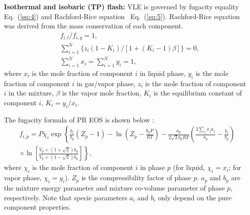 \textbf{Isothermal and isobaric (TP) flash:}
VLE is governed by fugacity equality Eq.~(\ref{eq:4}) and Rachford-Rice equation~\cite{rachford1952procedure} Eq.~(\ref{eq:5}). Rachford-Rice equation was derived from the mass conservation of each component.
\begin{align}
&f_{i, l}\big/f_{i, g}=1,  \label{eq:4} \\
&\sum_{i=1}^{N}\bigg\{z_i\left(1-K_i\right)\bigg/\left[1+\left(K_i-1\right)\beta\right]\bigg\}=0, \label{eq:5} \\
&\sum_{i=1}^{N}x_i=\sum_{i=1}^{N}y_i=1,  \label{eq:5-2}
\end{align}
where $x_i$ is the mole fraction of component $i$ in liquid phase, $y_i$ is the mole fraction of component $i$ in gas/vapor phase, $z_i$ is the mole fraction of component $i$ in the mixture, $\beta$ is the vapor mole fraction, $K_i$ is the equilibrium constant of component $i$, $K_i=y_i/x_i$. %




 
The fugacity formula of PR EOS is shown below \cite{yi2019multicomponent}:
\begin{align}
f_{i,p}=P \chi_i \exp \left\{\frac{b_i}{b_p}(Z_p - 1) - \ln(Z_p-\frac{b_p P}{RT}) - \frac{a_p} {2\sqrt{2} b_p R T} \left(\frac{2 \sum_j {x_j a_j} } {a_p} - \frac {b_i} {b_p}\right) \right. \nonumber\\
\left.\times \ln\left[\frac{V_p + \left(1+\sqrt{2}\right)b_p} {V_p + \left(1-\sqrt{2}\right) b_p}\right]\right\}, \label{fuga}
\end{align}
where $\chi_i$ is the mole fraction of component $i$ in phase $p$ (for liquid, $\chi_i=x_i$; for vapor phase, $\chi_i=y_i$). $Z_p$ is the compressibility factor of phase $p$. $a_p$ and $b_p$ are the mixture energy parameter and mixture co-volume parameter of phase $p$, respectively. Note that specie parameters $a_i$ and $b_i$ only depend on the pure component properties.

